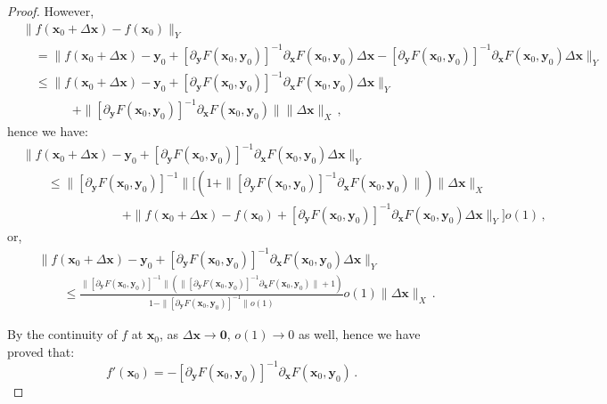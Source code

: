 \documentclass[openany]{book}
\theoremstyle{plain}
\theoremstyle{definition}
\newcommand*{\bv}{\boldsymbol} %
\begin{document}
\begin{proof}
	However, 
	\begin{align*}
		&\|f(\bv x_0 + \Delta \bv x) - f(\bv x_0)\|_Y 
		\\
		&\quad
		= \big\| f(\bv x_0 + \Delta \bv x) - \bv y_0 
		+ [\partial_{\bv y} F(\bv x_0, \bv y_0)]^{-1} \partial_{\bv x} F(\bv x_0, \bv y_0) 
			\Delta \bv x 
			- [\partial_{\bv y} F(\bv x_0, \bv y_0)]^{-1} \partial_{\bv x} F(\bv x_0, \bv y_0) 
			\Delta \bv x 
		\big\|_Y
		\\
		&\quad
		\leq \big\| f(\bv x_0 + \Delta \bv x) - \bv y_0 
		+ [\partial_{\bv y} F(\bv x_0, \bv y_0)]^{-1} \partial_{\bv x} F(\bv x_0, \bv y_0) 
			\Delta \bv x \big\|_Y 
		\\&\qquad\qquad
		+ \|[\partial_{\bv y} F(\bv x_0, \bv y_0)]^{-1} \partial_{\bv x} F(\bv x_0, \bv y_0)\| 
			\|\Delta \bv x\|_X\,,
	\end{align*}
	hence we have:
	\begin{align*}
		&\big\| f(\bv x_0 + \Delta \bv x) - \bv y_0 
		+ [\partial_{\bv y} F(\bv x_0, \bv y_0)]^{-1} \partial_{\bv x} F(\bv x_0, \bv y_0) 
			\Delta \bv x \big\|_Y
		\\&\qquad
		\leq
		\| [\partial_{\bv y} F(\bv x_0, \bv y_0)]^{-1} \| 
			\Big[
				(1 + \|[\partial_{\bv y} F(\bv x_0, \bv y_0)]^{-1} \partial_{\bv x} F(\bv x_0, \bv y_0)\|)\|\Delta \bv x\|_X 
		\\&\qquad\qquad\qquad\qquad
				+ \|f(\bv x_0 + \Delta \bv x) - f(\bv x_0) + [\partial_{\bv y} F(\bv x_0, \bv y_0)]^{-1} \partial_{\bv x} F(\bv x_0, \bv y_0) 
			\Delta \bv x \big\|_Y \Big] o(1) \,,
	\end{align*}
	or,
	\begin{align*}
		&\big\| f(\bv x_0 + \Delta \bv x) - \bv y_0 
		+ [\partial_{\bv y} F(\bv x_0, \bv y_0)]^{-1} \partial_{\bv x} F(\bv x_0, \bv y_0) 
			\Delta \bv x \big\|_Y
		\\&\qquad
		\leq
		\frac{\| [\partial_{\bv y} F(\bv x_0, \bv y_0)]^{-1} \| (\|[\partial_{\bv y} F(\bv x_0, \bv y_0)]^{-1} \partial_{\bv x} F(\bv x_0, \bv y_0)\| + 1) }
		{1 - \| [\partial_{\bv y} F(\bv x_0, \bv y_0)]^{-1} \| o(1) } o(1) \|\Delta \bv x\|_X\,.
	\end{align*}

	By the continuity of $f$ at $\bv x_0$, as $\Delta \bv x \to \bv 0$, $o(1) \to 0$ as well, hence we have proved that: 
	\begin{equation*}
		f'(\bv x_0) 
			= -[\partial_{\bv y} F(\bv x_0, \bv y_0)]^{-1} \partial_{\bv x} F(\bv x_0, \bv y_0)\,. 
	\end{equation*}
\end{proof}
\end{document}
